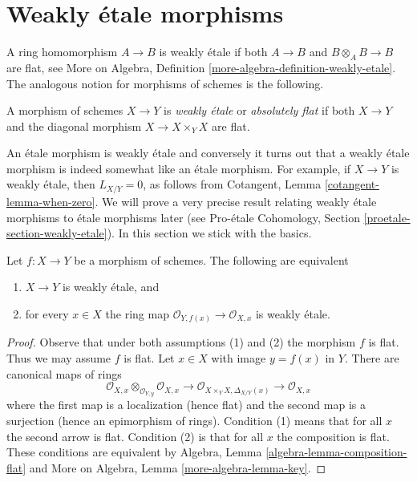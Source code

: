 \section{Weakly \'etale morphisms}
\label{section-weakly-etale}

\noindent
A ring homomorphism $A \to B$ is weakly \'etale if both $A \to B$ and
$B \otimes_A B \to B$ are flat, see
More on Algebra, Definition \ref{more-algebra-definition-weakly-etale}.
The analogous notion for morphisms of schemes is the following.

\begin{definition}
\label{definition-weakly-etale}
A morphism of schemes $X \to Y$ is {\it weakly \'etale} or
{\it absolutely flat} if both $X \to Y$ and the diagonal
morphism $X \to X \times_Y X$ are flat.
\end{definition}

\noindent
An \'etale morphism is weakly \'etale and conversely
it turns out that a weakly \'etale morphism is indeed somewhat
like an \'etale morphism. For example, if $X \to Y$ is weakly
\'etale, then $L_{X/Y} = 0$, as follows from
Cotangent, Lemma \ref{cotangent-lemma-when-zero}.
We will prove a very precise result relating weakly \'etale
morphisms to \'etale morphisms later (see
Pro-\'etale Cohomology, Section \ref{proetale-section-weakly-etale}).
In this section we stick with the basics.

\begin{lemma}
\label{lemma-check-weakly-etale-stalks}
Let $f : X \to Y$ be a morphism of schemes. The following are equivalent
\begin{enumerate}
\item $X \to Y$ is weakly \'etale, and
\item for every $x \in X$ the ring map
$\mathcal{O}_{Y, f(x)} \to \mathcal{O}_{X, x}$ is weakly \'etale.
\end{enumerate}
\end{lemma}

\begin{proof}
Observe that under both assumptions (1) and (2) the morphism $f$ is flat.
Thus we may assume $f$ is flat. Let $x \in X$ with image $y = f(x)$ in $Y$.
There are canonical maps of rings
$$
\mathcal{O}_{X, x} \otimes_{\mathcal{O}_{Y, y}} \mathcal{O}_{X, x}
\longrightarrow
\mathcal{O}_{X \times_Y X, \Delta_{X/Y}(x)}
\longrightarrow
\mathcal{O}_{X, x}
$$
where the first map is a localization (hence flat) and the second map is a
surjection (hence an epimorphism of rings).
Condition (1) means that for all $x$ the second arrow is flat.
Condition (2) is that for all $x$ the composition is flat.
These conditions are equivalent by
Algebra, Lemma \ref{algebra-lemma-composition-flat} and
More on Algebra, Lemma \ref{more-algebra-lemma-key}.
\end{proof}

